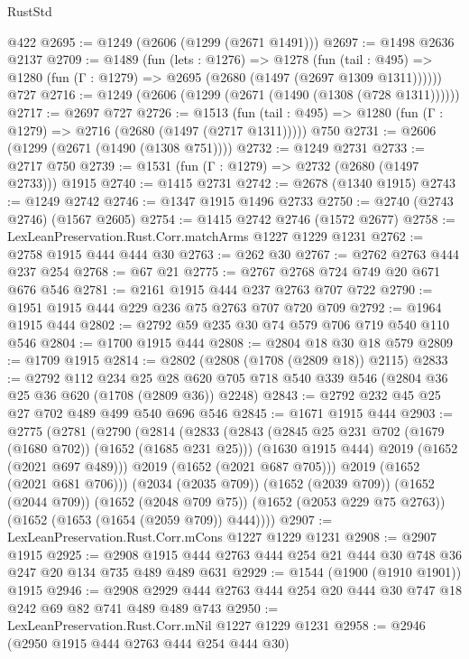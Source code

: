 \begin{lexlean}{RustStd}
\begin{coremodule}
    @422
@2695 := @1249 (@2606 (@1299 (@2671 @1491)))
@2697 := @1498 @2636 @2137
@2709 := @1489
    (fun (lets : @1276) =>
    @1278
      (fun (tail : @495) => @1280 (fun (Γ : @1279) => @2695 (@2680 (@1497 (@2697 @1309 @1311))))))
    @727
@2716 := @1249 (@2606 (@1299 (@2671 (@1490 (@1308 (@728 @1311))))))
@2717 := @2697 @727
@2726 := @1513
    (fun (tail : @495) => @1280 (fun (Γ : @1279) => @2716 (@2680 (@1497 (@2717 @1311)))))
    @750
@2731 := @2606 (@1299 (@2671 (@1490 (@1308 @751))))
@2732 := @1249 @2731
@2733 := @2717 @750
@2739 := @1531 (fun (Γ : @1279) => @2732 (@2680 (@1497 @2733))) @1915
@2740 := @1415 @2731
@2742 := @2678 (@1340 @1915)
@2743 := @1249 @2742
@2746 := @1347 @1915 @1496 @2733
@2750 := @2740 (@2743 @2746) (@1567 @2605)
@2754 := @1415 @2742 @2746 (@1572 @2677)
@2758 := LexLeanPreservation.Rust.Corr.matchArms @1227 @1229 @1231
@2762 := @2758 @1915 @444 @444 @30
@2763 := @262 @30
@2767 := @2762 @2763 @444 @237 @254
@2768 := @67 @21
@2775 := @2767 @2768 @724 @749 @20 @671 @676 @546
@2781 := @2161 @1915 @444 @237 @2763 @707 @722
@2790 := @1951 @1915 @444 @229 @236 @75 @2763 @707 @720 @709
@2792 := @1964 @1915 @444
@2802 := @2792 @59 @235 @30 @74 @579 @706 @719 @540 @110 @546
@2804 := @1700 @1915 @444
@2808 := @2804 @18 @30 @18 @579
@2809 := @1709 @1915
@2814 := @2802 (@2808 (@1708 (@2809 @18)) @2115)
@2833 := @2792
    @112
    @234
    @25
    @28
    @620
    @705
    @718
    @540
    @339
    @546
    (@2804 @36 @25 @36 @620 (@1708 (@2809 @36)) @2248)
@2843 := @2792 @232 @45 @25 @27 @702 @489 @499 @540 @696 @546
@2845 := @1671 @1915 @444
@2903 := @2775
    (@2781
      (@2790
        (@2814
          (@2833
            (@2843
              (@2845 @25 @231 @702 (@1679 (@1680 @702)) (@1652 (@1685 @231 @25)))
              (@1630 @1915 @444)
              @2019
              (@1652 (@2021 @697 @489)))
            @2019
            (@1652 (@2021 @687 @705)))
          @2019
          (@1652 (@2021 @681 @706)))
        (@2034 (@2035 @709))
        (@1652 (@2039 @709))
        (@1652 (@2044 @709))
        (@1652 (@2048 @709 @75))
        (@1652 (@2053 @229 @75 @2763))
        (@1652 (@1653 (@1654 (@2059 @709)) @444))))
@2907 := LexLeanPreservation.Rust.Corr.mCons @1227 @1229 @1231
@2908 := @2907 @1915
@2925 := @2908 @1915 @444 @2763 @444 @254 @21 @444 @30 @748 @36 @247 @20 @134 @735 @489 @489 @631
@2929 := @1544 (@1900 (@1910 @1901)) @1915
@2946 := @2908 @2929 @444 @2763 @444 @254 @20 @444 @30 @747 @18 @242 @69 @82 @741 @489 @489 @743
@2950 := LexLeanPreservation.Rust.Corr.mNil @1227 @1229 @1231
@2958 := @2946 (@2950 @1915 @444 @2763 @444 @254 @444 @30)

\end{coremodule}
\end{lexlean}
